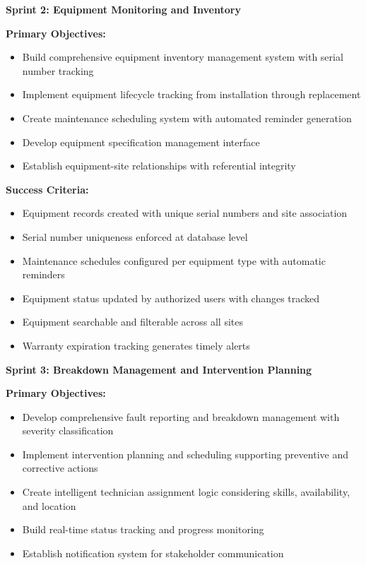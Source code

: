 \vspace{0.3cm}

\textbf{Sprint 2: Equipment Monitoring and Inventory}

\textbf{Primary Objectives:}
\begin{itemize}
\item Build comprehensive equipment inventory management system with serial number tracking
\item Implement equipment lifecycle tracking from installation through replacement
\item Create maintenance scheduling system with automated reminder generation
\item Develop equipment specification management interface
\item Establish equipment-site relationships with referential integrity
\end{itemize}

\textbf{Success Criteria:}
\begin{itemize}
\item Equipment records created with unique serial numbers and site association
\item Serial number uniqueness enforced at database level
\item Maintenance schedules configured per equipment type with automatic reminders
\item Equipment status updated by authorized users with changes tracked
\item Equipment searchable and filterable across all sites
\item Warranty expiration tracking generates timely alerts
\end{itemize}

\vspace{0.3cm}

\textbf{Sprint 3: Breakdown Management and Intervention Planning}

\textbf{Primary Objectives:}
\begin{itemize}
\item Develop comprehensive fault reporting and breakdown management with severity classification
\item Implement intervention planning and scheduling supporting preventive and corrective actions
\item Create intelligent technician assignment logic considering skills, availability, and location
\item Build real-time status tracking and progress monitoring
\item Establish notification system for stakeholder communication
\end{itemize}

